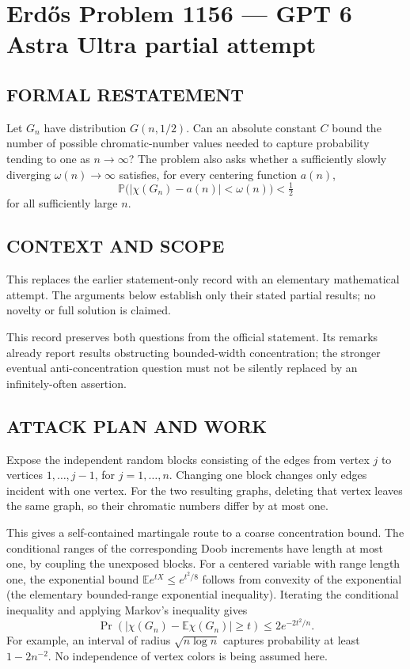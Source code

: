 \section*{Erd\H{o}s Problem 1156 --- GPT 6 Astra Ultra partial attempt}


\subsection*{FORMAL RESTATEMENT}
Let $G_n$ have distribution $G(n,1/2)$. Can an absolute constant $C$ bound the number of possible chromatic-number values needed to capture probability tending to one as $n\to\infty$? The problem also asks whether a sufficiently slowly diverging $\omega(n)\to\infty$ satisfies, for every centering function $a(n)$,
\[
\mathbb P\bigl(|\chi(G_n)-a(n)|<\omega(n)\bigr)<\tfrac12
\]
for all sufficiently large $n$.

\subsection*{CONTEXT AND SCOPE}
This replaces the earlier statement-only record with an elementary mathematical attempt. The arguments below establish only their stated partial results; no novelty or full solution is claimed.

This record preserves both questions from the official statement. Its remarks already report results obstructing bounded-width concentration; the stronger eventual anti-concentration question must not be silently replaced by an infinitely-often assertion.

\subsection*{ATTACK PLAN AND WORK}
Expose the independent random blocks consisting of the edges from vertex $j$
to vertices $1,\ldots,j-1$, for $j=1,\ldots,n$. Changing one block changes only
edges incident with one vertex. For the two resulting graphs, deleting that
vertex leaves the same graph, so their chromatic numbers differ by at most one.

This gives a self-contained martingale route to a coarse concentration bound.
The conditional ranges of the corresponding Doob increments have length at most
one, by coupling the unexposed blocks. For a centered variable with range length
one, the exponential bound $\mathbb E e^{tX}\le e^{t^2/8}$ follows from convexity
of the exponential (the elementary bounded-range exponential inequality).
Iterating the conditional inequality and applying Markov's inequality gives
\[\Pr(|\chi(G_n)-\mathbb E\chi(G_n)|\ge t)\le2e^{-2t^2/n}.\tag{1}\]
For example, an interval of radius $\sqrt{n\log n}$ captures probability at least
$1-2n^{-2}$. No independence of vertex colors is being assumed here.

